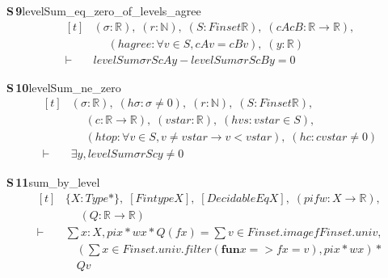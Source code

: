\documentclass[conference]{IEEEtran}
\theoremstyle{definition}
\newcommand{\lean}[1]{\textsf{\footnotesize #1}}
\begin{document}
\noindent\textbf{S\,9}\quad\lean{levelSum\_eq\_zero\_of\_levels\_agree}
{\footnotesize\[ \begin{aligned}[t]
&(\sigma : \mathbb{R} ),\; (\mathit{r} : \mathbb{N} ),\; (\mathit{S} : \mathit{Finset} \mathbb{R} ),\; (\mathit{cA} \mathit{cB} : \mathbb{R} \to \mathbb{R} ),\\
&\quad \; (\mathit{hagree} : \forall \mathit{v} \in \mathit{S}, \mathit{cA} \mathit{v} = \mathit{cB} \mathit{v}),\; (\mathit{y} : \mathbb{R} )\\
\vdash\;&\mathit{levelSum} \sigma \mathit{r} \mathit{S} \mathit{cA} \mathit{y} - \mathit{levelSum} \sigma \mathit{r} \mathit{S} \mathit{cB} \mathit{y} = 0
\end{aligned} \]}

\noindent\textbf{S\,10}\quad\lean{levelSum\_ne\_zero}
{\footnotesize\[ \begin{aligned}[t]
&(\sigma : \mathbb{R} ),\; (\mathit{hσ} : \sigma \neq 0),\; (\mathit{r} : \mathbb{N} ),\; (\mathit{S} : \mathit{Finset} \mathbb{R} ),\\
&\quad \; (\mathit{c} : \mathbb{R} \to \mathbb{R} ),\; (\mathit{vstar} : \mathbb{R} ),\; (\mathit{hvs} : \mathit{vstar} \in \mathit{S}),\\
&\quad \; (\mathit{htop} : \forall \mathit{v} \in \mathit{S}, \mathit{v} \neq \mathit{vstar} \to \mathit{v} < \mathit{vstar}),\; (\mathit{hc} : \mathit{c} \mathit{vstar} \neq 0)\\
\vdash\;&\exists \mathit{y}, \mathit{levelSum} \sigma \mathit{r} \mathit{S} \mathit{c} \mathit{y} \neq 0
\end{aligned} \]}

\noindent\textbf{S\,11}\quad\lean{sum\_by\_level}
{\footnotesize\[ \begin{aligned}[t]
&\{ \mathit{X} : \mathit{Type}*\},\; [\mathit{Fintype} \mathit{X}],\; [\mathit{DecidableEq} \mathit{X}],\; (\mathit{pi} \mathit{f} \mathit{w} : \mathit{X} \to \mathbb{R} ),\\
&\quad \; (\mathit{Q} : \mathbb{R} \to \mathbb{R} )\\
\vdash\;&\textstyle\sum \mathit{x} : \mathit{X}, \mathit{pi} \mathit{x} * \mathit{w} \mathit{x} * \mathit{Q} (\mathit{f} \mathit{x}) = \textstyle\sum \mathit{v} \in \mathit{Finset}.\mathit{image} \mathit{f} \mathit{Finset}.\mathit{univ},\\
&\quad (\textstyle\sum \mathit{x} \in \mathit{Finset}.\mathit{univ}.\mathit{filter} (\mathbf{fun} \mathit{x} => \mathit{f} \mathit{x} = \mathit{v}), \mathit{pi} \mathit{x} * \mathit{w} \mathit{x}) *\\
&\quad \mathit{Q} \mathit{v}
\end{aligned} \]}
\end{document}
